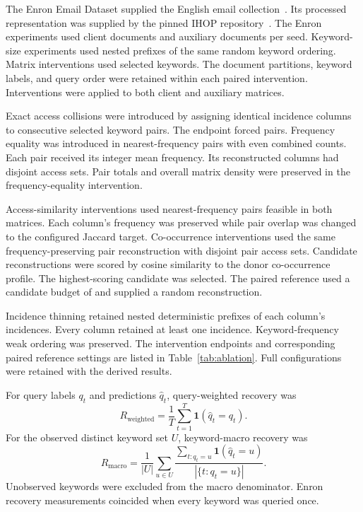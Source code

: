 \documentclass[12pt]{article}
\begin{document}
The Enron Email Dataset supplied the English email collection~\cite{enrondata}. Its processed representation was supplied by the pinned IHOP repository~\cite{ihopcode}. The Enron experiments used \EnronClient{} client documents and \EnronAuxiliary{} auxiliary documents per seed. Keyword-size experiments used nested prefixes of the same random keyword ordering. Matrix interventions used \InterventionKeywords{} selected keywords. The document partitions, keyword labels, and query order were retained within each paired intervention. Interventions were applied to both client and auxiliary matrices.

Exact access collisions were introduced by assigning identical incidence columns to consecutive selected keyword pairs. The endpoint forced \CollisionPairs{} pairs. Frequency equality was introduced in nearest-frequency pairs with even combined counts. Each pair received its integer mean frequency. Its reconstructed columns had disjoint access sets. Pair totals and overall matrix density were preserved in the frequency-equality intervention.

Access-similarity interventions used \SimilarityPairs{} nearest-frequency pairs feasible in both matrices. Each column's frequency was preserved while pair overlap was changed to the configured Jaccard target. Co-occurrence interventions used the same frequency-preserving pair reconstruction with disjoint pair access sets. Candidate reconstructions were scored by cosine similarity to the donor co-occurrence profile. The highest-scoring candidate was selected. The paired reference used a candidate budget of \CandidateBudget{} and supplied a random reconstruction.

Incidence thinning retained nested deterministic prefixes of each column's incidences. Every column retained at least one incidence. Keyword-frequency weak ordering was preserved. The intervention endpoints and corresponding paired reference settings are listed in Table~\ref{tab:ablation}. Full configurations were retained with the derived results.

For query labels $q_t$ and predictions $\hat q_t$, query-weighted recovery was
\[
R_{\mathrm{weighted}}=\frac{1}{T}\sum_{t=1}^{T}\mathbf{1}(\hat q_t=q_t).
\]
For the observed distinct keyword set $U$, keyword-macro recovery was
\[
R_{\mathrm{macro}}=\frac{1}{|U|}\sum_{u\in U}
\frac{\sum_{t:q_t=u}\mathbf{1}(\hat q_t=u)}{|\{t:q_t=u\}|}.
\]
Unobserved keywords were excluded from the macro denominator. Enron recovery measurements coincided when every keyword was queried once.
\end{document}
